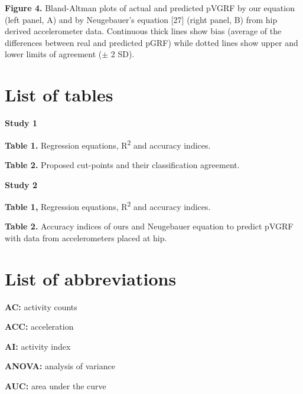 \documentclass[12pt]{article}
\def\blankpage{%
      \clearpage%
      \thispagestyle{empty}%
      \addtocounter{page}{+0}%
      \null%
      \clearpage}
\begin{document}
\noindent \textbf{Figure 4.} Bland-Altman plots of actual and predicted pVGRF by our equation (left panel, A) and by Neugebauer’s equation [27] (right panel, B) from hip derived accelerometer data. Continuous thick lines show bias (average of the differences between real and predicted pGRF) while dotted lines show upper and lower limits of agreement ($\pm$ 2 SD). 

\pagebreak

\section*{\hfil List of tables \hfil}
\vspace{0.5em}

\noindent \textbf{Study 1}
\vspace{0.5em}

\noindent \textbf{Table 1.} Regression equations, R\textsuperscript{2} and accuracy indices. 
\vspace{0.3em}

\noindent \textbf{Table 2.} Proposed cut-points and their classification agreement. 
\vspace{2em}

\noindent \textbf{Study 2}
\vspace{0.5em}

\noindent \textbf{Table 1,} Regression equations, R\textsuperscript{2} and accuracy indices. 
\vspace{0.3em}

\noindent \textbf{Table 2.} Accuracy indices of ours and Neugebauer equation to predict pVGRF with data from accelerometers placed at hip. 

\blankpage

\section*{\hfil List of abbreviations \hfil}
\vspace{0.5em}

\noindent \textbf{AC:} activity counts

\noindent \textbf{ACC:} acceleration

\noindent \textbf{AI:} activity index

\noindent \textbf{ANOVA:} analysis of variance

\noindent \textbf{AUC:} area under the curve
\end{document}
